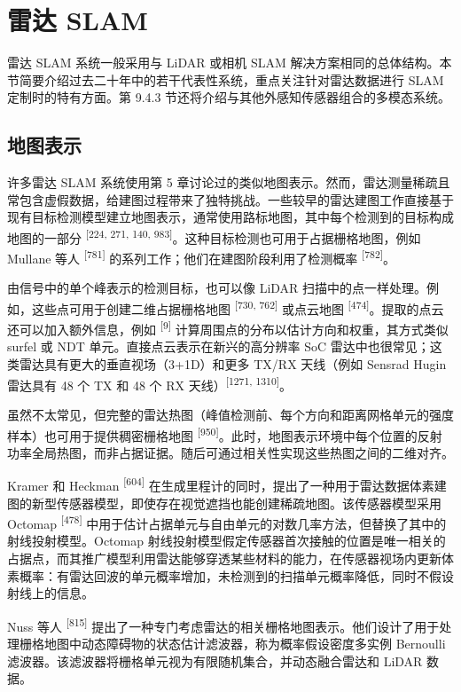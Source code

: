 \section{雷达 SLAM}

雷达 SLAM 系统一般采用与 LiDAR 或相机 SLAM 解决方案相同的总体结构。本节简要介绍过去二十年中的若干代表性系统，重点关注针对雷达数据进行 SLAM 定制时的特有方面。第 9.4.3 节还将介绍与其他外感知传感器组合的多模态系统。

\subsection{地图表示}

许多雷达 SLAM 系统使用第 5 章讨论过的类似地图表示。然而，雷达测量稀疏且常包含虚假数据，给建图过程带来了独特挑战。一些较早的雷达建图工作直接基于现有目标检测模型建立地图表示，通常使用路标地图，其中每个检测到的目标构成地图的一部分 \textsuperscript{[224, 271, 140, 983]}。这种目标检测也可用于占据栅格地图，例如 Mullane 等人 \textsuperscript{[781]} 的系列工作；他们在建图阶段利用了检测概率 \textsuperscript{[782]}。

由信号中的单个峰表示的检测目标，也可以像 LiDAR 扫描中的点一样处理。例如，这些点可用于创建二维占据栅格地图 \textsuperscript{[730, 762]} 或点云地图 \textsuperscript{[474]}。提取的点云还可以加入额外信息，例如 \textsuperscript{[9]} 计算周围点的分布以估计方向和权重，其方式类似 surfel 或 NDT 单元。直接点云表示在新兴的高分辨率 SoC 雷达中也很常见；这类雷达具有更大的垂直视场（3+1D）和更多 TX/RX 天线（例如 Sensrad Hugin 雷达具有 48 个 TX 和 48 个 RX 天线）\textsuperscript{[1271, 1310]}。

虽然不太常见，但完整的雷达热图（峰值检测前、每个方向和距离网格单元的强度样本）也可用于提供稠密栅格地图 \textsuperscript{[950]}。此时，地图表示环境中每个位置的反射功率全局热图，而非占据证据。随后可通过相关性实现这些热图之间的二维对齐。

Kramer 和 Heckman \textsuperscript{[604]} 在生成里程计的同时，提出了一种用于雷达数据体素建图的新型传感器模型，即使存在视觉遮挡也能创建稀疏地图。该传感器模型采用 Octomap \textsuperscript{[478]} 中用于估计占据单元与自由单元的对数几率方法，但替换了其中的射线投射模型。Octomap 射线投射模型假定传感器首次接触的位置是唯一相关的占据点，而其推广模型利用雷达能够穿透某些材料的能力，在传感器视场内更新体素概率：有雷达回波的单元概率增加，未检测到的扫描单元概率降低，同时不假设射线上的信息。

Nuss 等人 \textsuperscript{[815]} 提出了一种专门考虑雷达的相关栅格地图表示。他们设计了用于处理栅格地图中动态障碍物的状态估计滤波器，称为概率假设密度多实例 Bernoulli 滤波器。该滤波器将栅格单元视为有限随机集合，并动态融合雷达和 LiDAR 数据。

